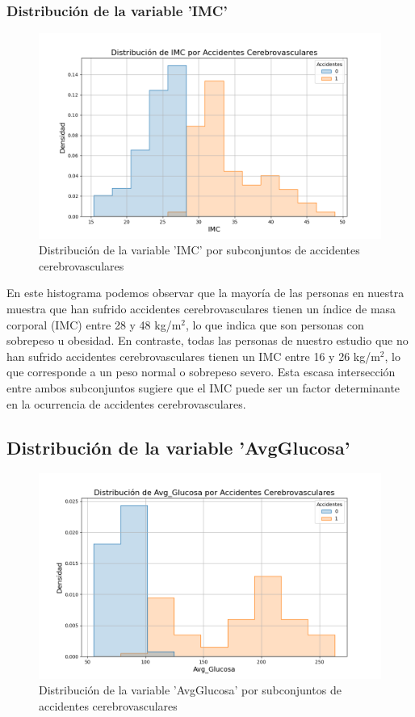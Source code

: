 \documentclass[a4paper, 12pt]{article}
\begin{document}
\subsubsection{Distribución de la variable 'IMC'}
\begin{figure}[H]
    \centering
    \includegraphics[width=1\textwidth]{img/Histogramas/distribucion_IMC_por_Accidentes.png}
    \caption{Distribución de la variable 'IMC' por subconjuntos de accidentes cerebrovasculares}
\end{figure}
En este histograma podemos observar que la mayoría de las personas en nuestra muestra que han sufrido accidentes cerebrovasculares tienen un índice de masa corporal (IMC) entre 28 y 48 kg/m\(^2\), lo que indica que son personas con sobrepeso u obesidad. En contraste, todas las personas de nuestro estudio que no han sufrido accidentes cerebrovasculares tienen un IMC entre 16 y 26 kg/m\(^2\), lo que corresponde a un peso normal o sobrepeso severo. Esta escasa intersección entre ambos subconjuntos sugiere que el IMC puede ser un factor determinante en la ocurrencia de accidentes cerebrovasculares.
\subsection{Distribución de la variable 'AvgGlucosa'}
\begin{figure}[H]
    \centering
    \includegraphics[width=1\textwidth]{img/Histogramas/distribucion_Avg_Glucosa_por_Accidentes.png}
    \caption{Distribución de la variable 'AvgGlucosa' por subconjuntos de accidentes cerebrovasculares}
\end{figure}
\end{document}
